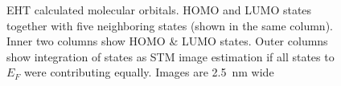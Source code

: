 \begin{figure}[h!]
{	}
	\caption{EHT calculated molecular orbitals. HOMO and LUMO states together with five neighboring states (shown in the same column). Inner two columns show HOMO \& LUMO states. Outer columns show integration of states as STM image estimation if all states to $E_F$ were contributing equally. Images are \SI{2.5}{\nano \meter} wide}
	
\end{figure}
\vfill